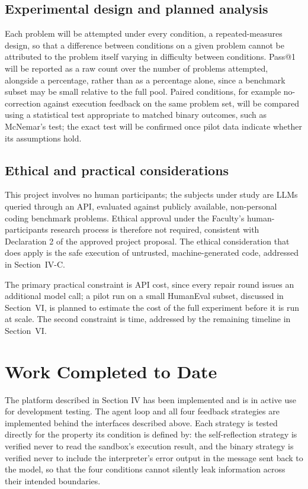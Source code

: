 \documentclass[conference]{IEEEtran}
\begin{document}
\subsection{Experimental design and planned analysis}

Each problem will be attempted under every condition, a repeated-measures design, so that a difference between conditions on a given problem cannot be attributed to the problem itself varying in difficulty between conditions. Pass@1 will be reported as a raw count over the number of problems attempted, alongside a percentage, rather than as a percentage alone, since a benchmark subset may be small relative to the full pool. Paired conditions, for example no-correction against execution feedback on the same problem set, will be compared using a statistical test appropriate to matched binary outcomes, such as McNemar's test; the exact test will be confirmed once pilot data indicate whether its assumptions hold.

\subsection{Ethical and practical considerations}

This project involves no human participants; the subjects under study are LLMs queried through an API, evaluated against publicly available, non-personal coding benchmark problems. Ethical approval under the Faculty's human-participants research process is therefore not required, consistent with Declaration 2 of the approved project proposal. The ethical consideration that does apply is the safe execution of untrusted, machine-generated code, addressed in Section~IV-C.

The primary practical constraint is API cost, since every repair round issues an additional model call; a pilot run on a small HumanEval subset, discussed in Section~VI, is planned to estimate the cost of the full experiment before it is run at scale. The second constraint is time, addressed by the remaining timeline in Section~VI.

\section{Work Completed to Date}

The platform described in Section IV has been implemented and is in active use for development testing. The agent loop and all four feedback strategies are implemented behind the interfaces described above. Each strategy is tested directly for the property its condition is defined by: the self-reflection strategy is verified never to read the sandbox's execution result, and the binary strategy is verified never to include the interpreter's error output in the message sent back to the model, so that the four conditions cannot silently leak information across their intended boundaries.
\end{document}
